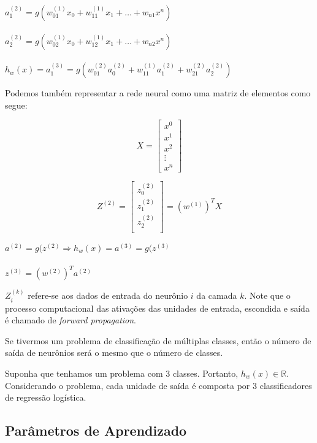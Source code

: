 \begin{center}
$a_1^{(2)} = g(w_{01}^{(1)} x_0 + w_{11}^{(1)} x_1 + \dots + w_{n1} x^n)$
\\~\\
$a_2^{(2)} = g(w_{02}^{(1)} x_0 + w_{12}^{(1)} x_1 + \dots + w_{n2} x^n)$
\\~\\
$h_w(x) = a_1^{(3)} = g(w_{01}^{(2)} a_0^{(2)} + w_{11}^{(1)} a_1^{(2)} + w_{21}^{(2)} a_2^{(2)})$
\end{center}

Podemos também representar a rede neural como uma matriz de elementos como segue:

\[X=
  \begin{bmatrix}
    x^0 \\
    x^1 \\
    x^2 \\
    \vdots \\
    x^n
  \end{bmatrix}\]
  
\[Z^{(2)}=
  \begin{bmatrix}
    z_0^{(2)} \\
    z_1^{(2)} \\
    z_2^{(2)} \\
  \end{bmatrix} = (w^{(1)})^T X\]
  
\begin{center}
$a^{(2)} = g(z^{(2)} \Rightarrow h_w(x) = a^{(3)} = g(z^{(3)}$
\\~\\
$z^{(3)} = (w^{(2)})^Ta^{(2)}$
\end{center}

$Z_i^{(k)}$ refere-se aos dados de entrada do neurônio $i$ da camada $k$. Note que o processo computacional das ativações das unidades de entrada, escondida e saída é chamado de \emph{forward propagation}.

Se tivermos um problema de classificação de múltiplas classes, então o número de saída de neurônios será o mesmo que o número de classes.

Suponha que tenhamos um problema com $3$ classes. Portanto, $h_w(x) \in \mathbb{R}$. Considerando o problema, cada unidade de saída é composta por 3 classificadores de regressão logística.

\subsection{Parâmetros de Aprendizado}
\label{ss.learning_parameters}

